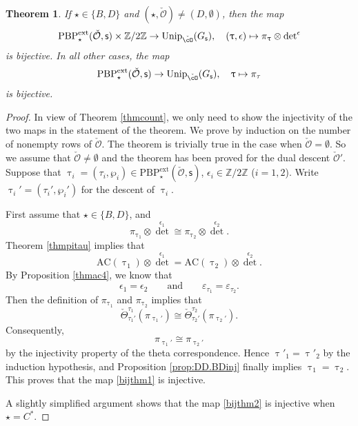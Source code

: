 \documentclass[12pt,a4paper]{amsart}
\newcommand{\CO}{{\mathcal {O}}}
\newcommand{\Z}{\mathbb{Z}}
\newcommand{\be}{\begin {equation}}
\newcommand{\ee}{\end {equation}}
\numberwithin{equation}{section}
\newtheorem{thm}{Theorem}[section]
\theoremstyle{remark}
\def\Unip{\mathrm{Unip}}
\def\PBPe{\mathrm{PBP}^{\mathrm{ext}}}
\begin{document}
\begin{thm}\label{thmac7}
If $\star\in \{B,D\}$ and $(\star, \check \CO)\neq (D, \emptyset)$, then  the map
\be\label{bijthm1}
 \PBPe_\star(\check \CO,\mathsf s)\times \Z/2\Z \rightarrow \Unip_{\check \cO}(G_\mathsf s),\quad (\uptau, \epsilon)\mapsto \pi_\uptau\otimes {\det}^{\epsilon}
\ee
is bijective. In all other cases, the
map
\be\label{bijthm2}
\PBPe_\star(\check \CO,\mathsf s)\rightarrow \Unip_{\check \cO}(G_\mathsf s), \quad \uptau\mapsto \pi_\tau
\ee
is bijective.
\end{thm}
\begin{proof}
In view of Theorem \ref{thmcount}, we only need to show the injectivity of  the two maps in the statement of the theorem. We prove by induction on the number of nonempty rows of $\check \CO$. The theorem is trivially true in the case when  $\check \CO=\emptyset$. So we assume that $\check \CO\neq \emptyset$  and the theorem has been proved for the dual descent $\check \CO'$.
Suppose that  $\uptau_i=(\tau_i, \wp_i)\in \PBPe_\star(\check \CO,\mathsf s)$, $\epsilon_i\in \Z/2\Z$ ($i=1,2$). Write  $\uptau_i'=(\tau_i', \wp_i')$ for the descent of $\uptau_i$.


First assume that $\star\in \{B,D\}$, and
\[
  \pi_{\uptau_1}\otimes {\det}^{\epsilon_1}\cong \pi_{\uptau_2}\otimes {\det}^{\epsilon_2}.
\]
Theorem \ref{thmpitau} implies that
\[
\mathrm{AC}(\uptau_1)\otimes {\det}^{\epsilon_1}=\mathrm{AC}(\uptau_2)\otimes {\det}^{\epsilon_2}.
\]
By Proposition \ref{thmac4}, we know that
\[
  \epsilon_1=\epsilon_2\qquad\textrm{and}\qquad \varepsilon_{\tau_1}=\varepsilon_{\tau_2}.
\]
Then the definition of $ \pi_{\uptau_1}$ and $ \pi_{\uptau_2}$ implies that
\[
 \check  \Theta_{\tau_1'}^{\tau_1}(\pi_{\uptau_1'})\cong \check \Theta_{\tau_2'}^{\tau_2}(\pi_{\uptau_2'}).
\]
 Consequently,
\[
\pi_{\uptau_1'}\cong \pi_{\uptau_2'}
\]
by the injectivity property of the theta correspondence. Hence $\uptau'_1=\uptau'_2$ by the induction hypothesis, and Proposition \ref{prop:DD.BDinj} finally implies $\uptau_1=\uptau_2$.
This proves that the map \eqref{bijthm1} is injective.

A slightly simplified argument shows that the map \eqref{bijthm2} is injective when $\star=C^*$.



\end{proof}
\end{document}
